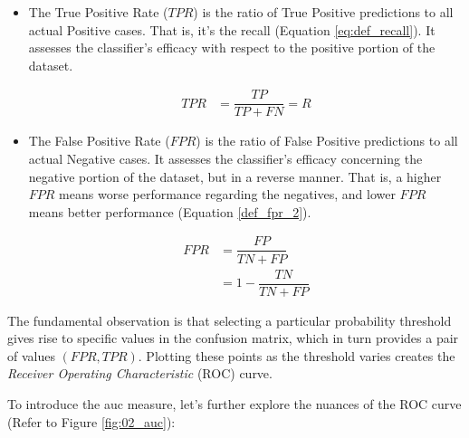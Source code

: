 \begin{itemize}
    \item The True Positive Rate ($TPR$) is the ratio of True Positive predictions to all actual Positive cases. That is, it's the recall (Equation \ref{eq:def_recall}). It assesses the classifier's efficacy with respect to the positive portion of the dataset.

    \begin{align}
        TPR &= \dfrac{TP}{TP+FN} =R \label{def_tpr} 
    \end{align}
    
    \item The False Positive Rate ($FPR$) is the ratio of False Positive predictions to all actual Negative cases. It assesses the classifier's efficacy concerning the negative portion of the dataset, but in a reverse manner. That is, a  higher $FPR$ means worse performance regarding the negatives, and lower $FPR$ means better performance (Equation  \ref{def_fpr_2}).
    
    \begin{align}
        FPR &= \dfrac{FP}{TN+FP} \label{def_fpr} \\
            &= 1 - \dfrac{TN}{TN+FP} \label{def_fpr_2}
    \end{align}
    
\end{itemize}

The fundamental observation is that selecting a particular probability threshold gives rise to specific values in the confusion matrix, which in turn provides a pair of values $(FPR, TPR)$. Plotting these points as the threshold varies creates the \emph{Receiver Operating Characteristic} (ROC) curve.

To introduce the \gls{auc} measure, let's further explore the nuances of the ROC curve (Refer to Figure \ref{fig:02_auc}):



